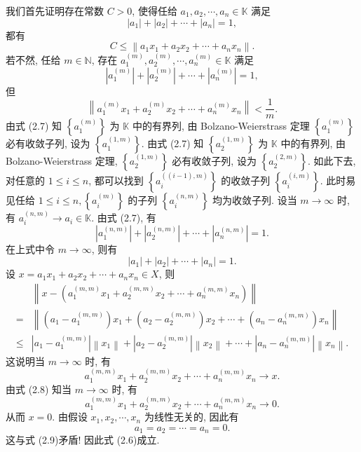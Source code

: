 \documentclass[openany]{ctexbook}
\makeatletter
\theoremstyle{kaiti}
\theoremstyle{normal}
\renewenvironment{proof}[1][\proofname]{\par
    \pushQED{\qed}%
    \normalfont \topsep6\p@\@plus6\p@\relax
    \trivlist
    \item\relax
    {\heiti #1}\hspace{2\labelsep}\ignorespaces
  }{%
    \popQED\endtrivlist\@endpefalse
  }
\makeatother
\begin{document}
\begin{proof}
我们首先证明存在常数 $C>0$, 使得任给 $a_1, a_2, \cdots, a_n \in \mathbb{K}$ 满足
$$
\left|a_1\right|+\left|a_2\right|+\cdots+\left|a_n\right|=1,
$$
都有
\begin{equation}
  C \leqslant\left\|a_1 x_1+a_2 x_2+\cdots+a_n x_n\right\|.
\end{equation}
若不然, 任给 $m \in \mathbb{N}$, 存在 $a_1^{(m)}, a_2^{(m)}, \cdots, a_n^{(m)} \in \mathbb{K}$ 满足
\begin{equation}
  \left|a_1^{(m)}\right|+\left|a_2^{(m)}\right|+\cdots+\left|a_n^{(m)}\right|=1,
\end{equation}
但
\begin{equation}
  \left\|a_1^{(m)} x_1+a_2^{(m)} x_2+\cdots+a_n^{(m)} x_n\right\|<\frac{1}{m}.
\end{equation}
由式 (2.7) 知 $\left\{a_1^{(m)}\right\}$ 为 $\mathbb{K}$ 中的有界列, 由 Bolzano-Weierstrass 定理 $\left\{a_1^{(m)}\right\}$ 必有收敛子列, 设为 $\left\{a_1^{(1, m)}\right\}$. 由式 (2.7) 知 $\left\{a_2^{(1, m)}\right\}$ 为 $\mathbb{K}$ 中的有界列, 由 Bolzano-Weierstrass 定理, $\left\{a_2^{(1, m)}\right\}$ 必有收敛子列, 设为 $\left\{a_2^{(2, m)}\right\}$. 如此下去, 对任意的 $1 \leqslant i \leqslant n$, 都可以找到 $\left\{a_{i}^{((i-1), m)}\right\}$ 的收敛子列 $\left\{a_{i}^{(i, m)}\right\}$. 此时易见任给 $1 \leqslant i \leqslant n,\left\{a_{i}^{(m)}\right\}$ 的子列 $\left\{a_{i}^{(n, m)}\right\}$ 均为收敛子列. 设当 $m \rightarrow \infty$ 时, 有 $a_{i}^{(n, m)} \rightarrow a_{i} \in \mathbb{K}.$
由式 (2.7), 有
$$
\left|a_1^{(n, m)}\right|+\left|a_2^{(n, m)}\right|+\cdots+\left|a_n^{(n, m)}\right|=1.
$$
在上式中令 $m \rightarrow \infty$, 则有
\begin{equation}
  \left|a_1\right|+\left|a_2\right|+\cdots+\left|a_n\right|=1.
\end{equation}
设 $x=a_1 x_1+a_2 x_2+\cdots+a_n x_n \in X$, 则
$$
\begin{aligned}
&\left\|x-\left(a_1^{(m, m)} x_1+a_2^{(m, m)} x_2+\cdots+a_n^{(m, m)} x_n\right)\right\| \\
=&\left\|\left(a_1-a_1^{(m, m)}\right) x_1+\left(a_2-a_2^{(m, m)}\right) x_2+\cdots+\left(a_n-a_n^{(m, m)}\right) x_n\right\| \\
\leqslant &\left|a_1-a_1^{(m, m)}\right|\left\|x_1\right\|+\left|a_2-a_2^{(m, m)}\right|\left\|x_2\right\|+\cdots+\left|a_n-a_n^{(m, m)}\right|\left\|x_n\right\|.
\end{aligned}
$$
这说明当 $m \rightarrow \infty$ 时, 有
$$
a_1^{(m, m)} x_1+a_2^{(m, m)} x_2+\cdots+a_n^{(m, m)} x_n \rightarrow x.
$$
由式 (2.8) 知当 $m \rightarrow \infty$ 时, 有
$$
a_1^{(m, m)} x_1+a_2^{(m, m)} x_2+\cdots+a_n^{(m, m)} x_n \rightarrow 0.
$$
从而 $x=0$. 由假设 $x_1, x_2, \cdots, x_n$ 为线性无关的, 因此有
$$
a_1=a_2=\cdots=a_n=0.
$$
这与式 (2.9)矛盾! 因此式 (2.6)成立.


\end{proof}
\end{document}
